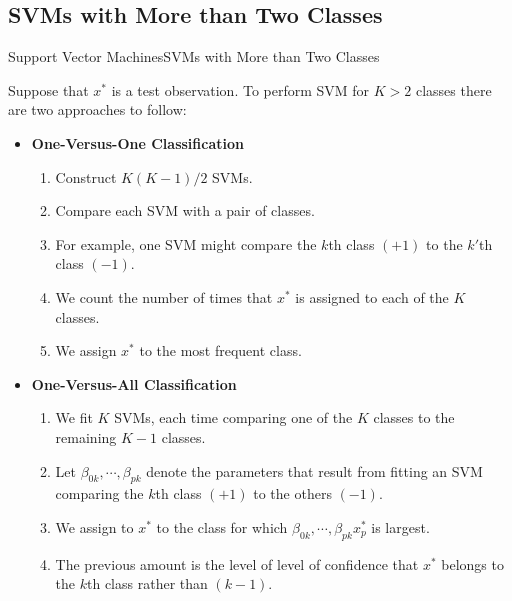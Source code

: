 \subsection{SVMs with More than Two Classes}
\begin{frame}{Support Vector Machines}{SVMs with More than Two Classes} 

Suppose that $x^\ast$ is a test observation. To perform SVM for $K > 2$ classes there are two approaches to follow: \pause 

\begin{itemize}
    \item \textbf{One-Versus-One Classification} \pause 
    \begin{enumerate}
        \item Construct $K(K-1)/2$ SVMs.  \pause 
        \item Compare each SVM with a pair of classes.  \pause 
        \item For example, one SVM might compare the $k$th class $(+1)$ to the $k'$th class $(-1)$.   \pause 
         
        \item  We count the number of times that $x^\ast$ is assigned to each of the $K$ classes.  \pause 

        \item We assign $x^\ast$ to the most frequent class. \pause
    \end{enumerate}

    \item \textbf{One-Versus-All Classification}
    \begin{enumerate}
        \item We fit $K$ SVMs, each time comparing one of the $K$ classes to the remaining $K - 1$ classes.  \pause 
        \item Let $\beta_{0k} ,\cdots, \beta_{pk} $ denote the parameters that result from fitting an SVM comparing the $k$th class $(+1)$ to the others $(-1)$.   \pause 
        \item We assign to $x^\ast$ to the class for which $\beta_{0k} ,\cdots, \beta_{pk} x_p^\ast $ is largest. \pause
        \item The previous amount is the level of level of confidence that $x^\ast$ belongs to the $k$th class rather than $(k-1)$.
    \end{enumerate}
\end{itemize}
    
\end{frame}




